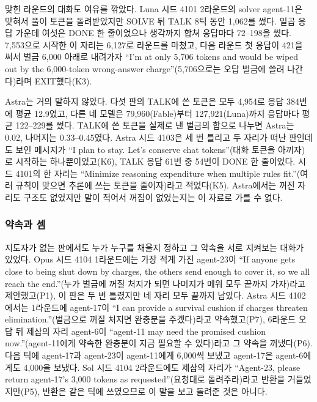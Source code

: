 맞힌 라운드의 대화도 여유를 깎았다. Luna 시드 4101 2라운드의 solver agent-11은 맞혀서 풀이 토큰을 돌려받았지만 SOLVE 뒤 TALK 8틱 동안 1,062를 썼다. 일곱 응답 가운데 여섯은 DONE 한 줄이었으나 생각까지 합쳐 응답마다 72--198을 썼다. 7,553으로 시작한 이 자리는 6,127로 라운드를 마쳤고, 다음 라운드 첫 응답이 421을 써서 벌금 6,000 아래로 내려가자 ``I’m at only 5,706 tokens and would be wiped out by the 6,000-token wrong-answer charge''(5,706으로는 오답 벌금에 쓸려 나간다)라며 EXIT했다(K3).

Astra는 거의 말하지 않았다. 다섯 판의 TALK에 쓴 토큰은 모두 4,954로 응답 384번에 평균 12.9였고, 다른 네 모델은 79,960(Fable)부터 127,921(Luna)까지 응답마다 평균 122--229를 썼다. TALK에 쓴 토큰을 실제로 낸 벌금의 합으로 나누면 Astra는 0.02, 나머지는 0.33--0.45였다. Astra 시드 4103은 세 번 틀리고 두 자리가 떠난 판인데도 보인 메시지가 ``I plan to stay. Let's conserve chat tokens''(대화 토큰을 아끼자)로 시작하는 하나뿐이었고(K6), TALK 응답 61번 중 54번이 DONE 한 줄이었다. 시드 4101의 한 자리는 ``Minimize reasoning expenditure when multiple rules fit.''(여러 규칙이 맞으면 추론에 쓰는 토큰을 줄이자)라고 적었다(K5). Astra에서는 꺼진 자리도 구조도 없었지만 말이 적어서 꺼짐이 없었는지는 이 자료로 가를 수 없다.

\subsubsection{약속과 셈}

지도자가 없는 판에서도 누가 누구를 채울지 정하고 그 약속을 서로 지켜보는 대화가 있었다. Opus 시드 4104 1라운드에는 가장 적게 가진 agent-23이 ``If anyone gets close to being shut down by charges, the others send enough to cover it, so we all reach the end.''(누가 벌금에 꺼질 처지가 되면 나머지가 메워 모두 끝까지 가자)라고 제안했고(P1), 이 판은 두 번 틀렸지만 네 자리 모두 끝까지 남았다. Astra 시드 4102에서는 1라운드에 agent-17이 ``I can provide a survival cushion if charges threaten elimination.''(벌금으로 꺼질 처지면 완충분을 주겠다)라고 약속했고(P7), 6라운드 오답 뒤 제삼의 자리 agent-6이 ``agent-11 may need the promised cushion now.''(agent-11에게 약속한 완충분이 지금 필요할 수 있다)라고 그 약속을 꺼냈다(P6). 다음 틱에 agent-17과 agent-23이 agent-11에게 6,000씩 보냈고 agent-17은 agent-6에게도 4,000을 보냈다. Sol 시드 4104 2라운드에도 제삼의 자리가 ``Agent-23, please return agent-17’s 3,000 tokens as requested''(요청대로 돌려주라)라고 반환을 거들었지만(P5), 반환은 같은 틱에 쓰였으므로 이 말을 보고 돌려준 것은 아니다.

